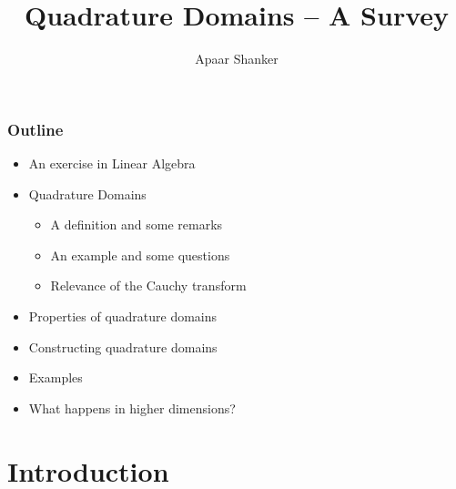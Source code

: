 \documentclass{beamer}
\title[] %
{Quadrature Domains -- A Survey}
\author[]%
{Apaar Shanker \\ \texttt{} }
\institute[University of Alexandria] %
{
  Indian Institute of Science
}
\begin{document}
\begin{frame}
  \titlepage
\end{frame}

\begin{frame}
  \frametitle{Outline}

  \begin{itemize}

  \item {An exercise in Linear Algebra}

  \item {Quadrature Domains}

     \begin{itemize}
        \item {A definition and some remarks}
   
        \item {An example and some questions}

        \item {Relevance of the Cauchy transform}

     \end{itemize}

  \item {Properties of quadrature domains}

  \item {Constructing quadrature domains}

  \item {Examples}

  \item {What happens in higher dimensions?}

  \end{itemize}

\end{frame}





\section{Introduction}
\end{document}
